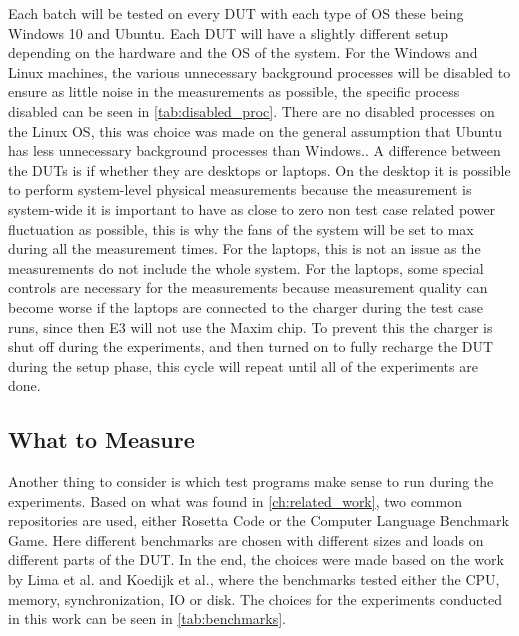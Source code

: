 Each batch will be tested on every DUT with each type of OS these being Windows 10 and Ubuntu. Each DUT will have a slightly different setup depending on the hardware and the OS of the system. For the Windows and Linux machines, the various unnecessary background processes will be disabled to ensure as little noise in the measurements as possible\cite*[]{sestoft2013microbenchmarks}, the specific process disabled can be seen in \cref{tab:disabled_proc}. There are no disabled processes on the Linux OS, this was choice was made on the general assumption that Ubuntu has less unnecessary background processes than Windows.. A difference between the DUTs is if whether they are desktops or laptops. On the desktop it is possible to perform system-level physical measurements because the measurement is system-wide it is important to have as close to zero non test case related power fluctuation as possible, this is why the fans of the system will be set to max during all the measurement times. For the laptops, this is not an issue as the measurements do not include the whole system. For the laptops, some special controls are necessary for the measurements because measurement quality can become worse if the laptops are connected to the charger during the test case runs, since then E3 will not use the Maxim chip\cite{E3Video}. To prevent this the charger is shut off during the experiments, and then turned on to fully recharge the DUT during the setup phase, this cycle will repeat until all of the experiments are done.



\subsection{What to Measure}

Another thing to consider is which test programs make sense to run during the experiments. Based on what was found in \cref{ch:related_work}, two common repositories are used, either Rosetta Code\cite*[]{rosetta_code} or the Computer Language Benchmark Game\cite*[]{benchmark_game}. Here different benchmarks are chosen with different sizes and loads on different parts of the DUT. In the end, the choices were made based on the work by Lima et al.\cite*[]{greenland2016statistical} and Koedijk et al.\cite*[]{Koedijk2022diff}, where the benchmarks tested either the CPU, memory, synchronization, IO or disk. The choices for the experiments conducted in this work can be seen in \cref{tab:benchmarks}.




